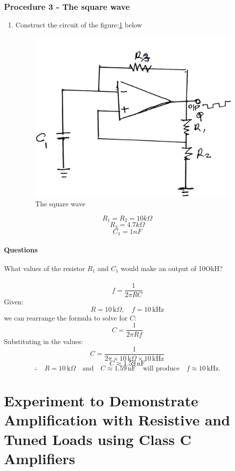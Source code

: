 \documentclass[12pt,a4paper]{report}
\begin{document}
\subsection{Procedure 3 - The square wave}
\begin{enumerate}
    \item Construct the circuit of the figure:\ref{fig:3} below
    \begin{figure}[H]
        \centering
        \includegraphics[width=0.5\linewidth]{circuit3_1.jpeg}
        \caption{The square wave}
        \label{fig:3}
    \end{figure}
\end{enumerate}
$$ R_1 = R_2 = 10k \Omega$$
$$ R_3 = 4.7k \Omega$$
$$ C_1 = 1nF $$
\subsubsection{Questions}
What values of the resistor $R_1$ and $C_1$ would make an output of 10OkH?\\
\\
\[
f = \frac{1}{2 \pi RC}
\]
Given:
\[
R = 10 \, \text{k}\Omega, \quad f = 10 \, \text{kHz}
\]
we can rearrange the formula to solve for \( C \):
\[
C = \frac{1}{2 \pi R f}
\]
Substituting in the values:
\[
C = \frac{1}{2 \pi \times 10 \, \text{k}\Omega \times 10 \, \text{kHz}}
\]
\[
C \approx 1.59 \, \text{nF}
\]
\[
\therefore \quad R = 10 \, \text{k}\Omega \quad \text{and} \quad C \approx 1.59 \, \text{nF} \quad \text{will produce} \quad f \approx 10 \, \text{kHz}.
\]

\chapter{Experiment to Demonstrate Amplification with Resistive and Tuned Loads using Class C Amplifiers}
\end{document}
